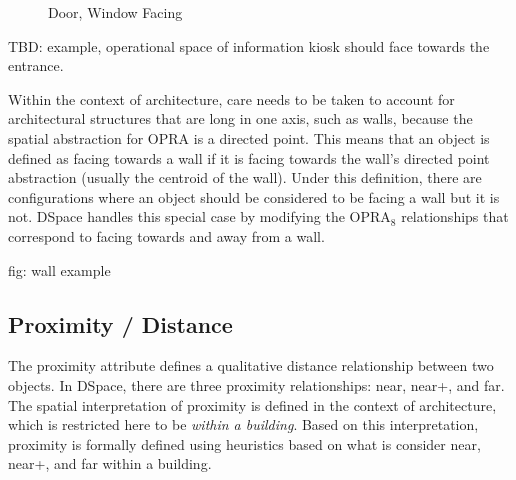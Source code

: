 \documentclass[12pt]{ucthesis}
\begin{document}
\begin{figure}[H]
 \centering
  \hspace{10 mm}
 \caption{Door, Window Facing}
\label{door-window-facing}
\end{figure}

TBD: example, operational space of information kiosk should face towards the entrance.

Within the context of architecture, care needs to be taken to account for architectural structures that are long in one axis, such as walls, because the spatial abstraction for OPRA is a directed point. This means that an object is defined as facing towards a wall if it is facing towards the wall's directed point abstraction (usually the centroid of the wall). Under this definition, there are configurations where an object should be considered to be facing a wall but it is not. DSpace handles this special case by modifying the OPRA$_{8}$ relationships that correspond to facing towards and away from a wall. 

fig: wall example

\subsection{Proximity / Distance}
The proximity attribute defines a qualitative distance relationship between two objects. In DSpace, there are three proximity relationships: near, near+, and far. The spatial interpretation of proximity is defined in the context of architecture, which is restricted here to be \emph{within a building}. Based on this interpretation, proximity is formally defined using heuristics based on what is consider near, near+, and far within a building.   
\end{document}
